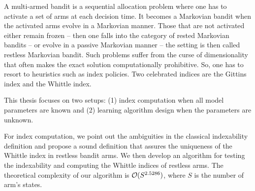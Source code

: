 A multi-armed bandit is a sequential allocation problem where one has to activate a set of arms at each decision time.
It becomes a Markovian bandit when the activated arms evolve in a Markovian manner.
Those that are not activated either remain frozen -- then one falls into the category of rested Markovian bandits -- or evolve in a passive Markovian manner -- the setting is then called restless Markovian bandit.
Such problems suffer from the curse of dimensionality that often makes the exact solution computationally prohibitive.
So, one has to resort to heuristics such as index policies.
Two celebrated indices are the Gittins index and the Whittle index.

This thesis focuses on two setups: (1) index computation when all model parameters are known and (2) learning algorithm design when the parameters are unknown.

For index computation, we point out the ambiguities in the classical indexability definition and propose a sound definition that assures the uniqueness of the Whittle index in restless bandit arms.
We then develop an algorithm for testing the indexability and computing the Whittle indices of restless arms.
The theoretical complexity of our algorithm is $\mathcal{O}(S^{2.5286})$, where $S$ is the number of arm's states.


